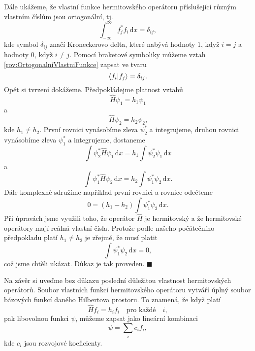 Dále ukážeme, že vlastní funkce hermitovského operátoru příslušející různým vlastním číslům jsou ortogonální, tj.
\begin{equation}
\boxed{\int_{-\infty}^{\infty} f_j^\ast f_i \,\mathrm{d}x = \delta_{ij},}
\label{rov:OrtogonalniVlastniFunkce}
\end{equation}
kde symbol $\delta_{ij}$ značí Kroneckerovo delta, které nabývá hodnoty $1$, když $i=j$ a hodnoty $0$, když $i \not = j$. Pomocí braketové symboliky můžeme vztah \eqref{rov:OrtogonalniVlastniFunkce} zapsat ve tvaru
\begin{equation}
\braket{f_i|f_j} = \delta_{ij}.
\nonumber
\end{equation}
Opět si tvrzení dokážeme. Předpokládejme platnost vztahů
\begin{equation}
\hat{H} \psi_1 = h_1 \psi_1
\nonumber
\end{equation}
a
\begin{equation}
\hat{H} \psi_2 = h_2 \psi_2 \mbox{,}
\nonumber
\end{equation}
kde $h_1 \not = h_2$. První rovnici vynásobíme zleva $\psi_2^\ast$ a integrujeme, druhou rovnici vynásobíme zleva $\psi_1^\ast$ a integrujeme, dostaneme
\begin{equation}
\int \psi_2^\ast \hat{H} \psi_1 \,\mathrm{d}x  = h_1 \int \psi_2^\ast \psi_1 \,\mathrm{d}x
\nonumber
\end{equation}
a
\begin{equation}
\int \psi_1^\ast \hat{H} \psi_2 \,\mathrm{d}x  = h_2 \int \psi_1^\ast \psi_2 \,\mathrm{d}x.
\nonumber
\end{equation}
Dále komplexně sdružíme například první rovnici a rovnice odečteme
\begin{equation}
0 = (h_1 - h_2 ) \int \psi_1^\ast \psi_2 \,\mathrm{d}x.
\nonumber
\end{equation}
Při úpravách jsme využili toho, že operátor $\hat{H}$ je hermitovský a že hermitovské operátory mají reálná vlastní čísla. Protože podle našeho počátečního předpokladu platí $h_1 \not = h_2$ je zřejmé, že musí platit
\begin{equation}
\int \psi_1^\ast \psi_2 \,\mathrm{d}x = 0,
\nonumber
\end{equation}
což jsme chtěli ukázat. Důkaz je tak proveden. \hfill {\footnotesize $\blacksquare$}

Na závěr si uveďme bez důkazu poslední důležitou vlastnost hermitovských operátorů. Soubor vlastních funkcí hermitovského operátoru vytváří úplný soubor bázových funkcí daného Hilbertova prostoru. To znamená, že když platí
\begin{equation}
\hat{H} f_i = h_i f_i \quad \mbox{pro každé}\quad i,
\nonumber
\end{equation}
pak libovolnou funkci $\psi$, můžeme zapsat jako lineární kombinaci
\begin{equation}
\psi = \sum_{i} c_i f_i,
\nonumber
\end{equation}
kde $c_i$ jsou rozvojové koeficienty.



